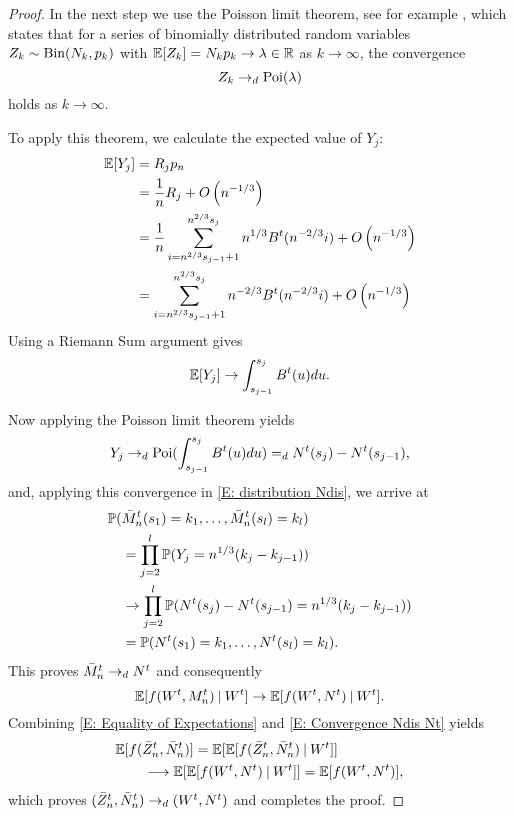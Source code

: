 \begin{proof}
In the next step we use the Poisson limit theorem, see for example \cite{Billingsley2009},
which states that for a series of binomially distributed random variables $Z_k \sim \operatorname*{Bin}(N_k, p_k)$
with $\mathbb{E}[Z_k] = N_k p_k \rightarrow \lambda \in \mathbb{R}$ as $k \rightarrow \infty$,
the convergence 
\begin{equation}
	Z_k \rightarrow_d \operatorname*{Poi}(\lambda)
\end{equation}
holds as $k \rightarrow \infty$.

To apply this theorem, we calculate the expected value of $Y_j$:
\begin{align*}
\mathbb{E}[Y_j] 
&= R_j p_n \\
&= \frac{1}{n} R_j + O\left(n^{-1 / 3}\right)\\
&= \frac{1}{n} \sum_{i=n^{2 / 3}s_{j-1}+1}^{n^{2 / 3}s_j}n^{1 / 3}B^t(n^{-2 / 3}i) + O\left(n^{-1 / 3}\right)\\
&= \sum_{i=n^{2 / 3}s_{j-1}+1}^{n^{2 / 3}s_j}n^{-2 / 3}B^t(n^{-2 / 3}i) + O\left(n^{-1 / 3}\right)
\end{align*}
Using a Riemann Sum argument gives
\begin{equation}
\mathbb{E}[Y_j] \rightarrow \int_{s_{j-1}}^{s_j} B^t(u)du.
\end{equation}

Now applying the Poisson limit theorem yields
\begin{equation} \label{E: convergence dist Yj}
Y_j \rightarrow_d \operatorname*{Poi}( \int_{s_{j-1}}^{s_j} B^t(u)du ) =_d N^t(s_j) - N^t(s_{j-1}),
\end{equation}
and, applying this convergence in \eqref{E: distribution Ndis}, we arrive at
\begin{equation}
\begin{aligned}
&\mathbb{P}(\bar{M}_n^t(s_1) = k_1, \dots, \bar{M}_n^t(s_l) = k_l) \\
&\quad = \prod_{j=2}^{l} \mathbb{P}( Y_j = n^{1 / 3}(k_j - k_{j-1}) ) \\
&\quad \rightarrow \prod_{j=2}^{l} \mathbb{P}( N^t(s_j) - N^t(s_{j-1}) = n^{1 / 3}(k_j - k_{j-1}) ) \\
&\quad = \mathbb{P}(N^t(s_1) = k_1, \dots, N^t(s_l) = k_l).
\end{aligned}
\end{equation}
This proves $\bar{M}_n^t \rightarrow_d N^t$ and consequently
\begin{equation} \label{E: Convergence Ndis Nt}
	\mathbb{E}[f(W^t, M_n^t) \: | \: W^t] \rightarrow \mathbb{E}[f(W^t, N^t) \: | \: W^t].
\end{equation}
Combining \eqref{E: Equality of Expectations} and \eqref{E: Convergence Ndis Nt} yields
\begin{equation}
\begin{aligned}
&\mathbb{E}[f(\bar{Z}^t_n, \bar{N}_n^t)] = \mathbb{E}[\mathbb{E}[f(\bar{Z}^t_n, \bar{N}_n^t) \: | \: W^t]] \\
&\qquad \longrightarrow \mathbb{E}[\mathbb{E}[f(W^t, N^t) \: | \: W^t]] = \mathbb{E}[f(W^t, N^t)],
\end{aligned}
\end{equation}
which proves $(\bar{Z}^t_n, \bar{N}_n^t) \rightarrow_d (W^t, N^t)$ and completes the proof.
\end{proof}


